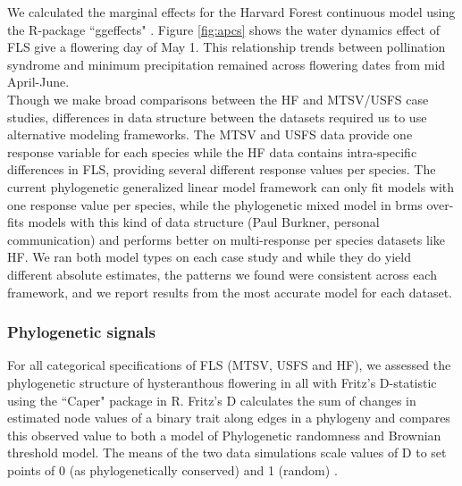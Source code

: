 \documentclass{article}\usepackage[]{graphicx}\usepackage[]{color}
\begin{document}
{%
%
%


\indent We calculated the marginal effects for the Harvard Forest continuous model using the R-package ``ggeffects" \citep{Ludecke2018}. Figure \ref{fig:apcs} shows the water dynamics effect of FLS give a flowering day of May 1. This relationship trends between pollination syndrome and minimum precipitation remained across flowering dates from mid April-June. \\

\noindent Though we make broad comparisons between the HF and MTSV/USFS case studies, differences in data structure between the datasets required us to use alternative modeling frameworks. The MTSV and USFS data provide one response variable for each species while the HF data contains intra-specific differences in FLS, providing several different response values per species. The current phylogenetic generalized linear model framework can only fit models with one response value per species, while the phylogenetic mixed model in brms over-fits models with this kind of data structure (Paul Burkner, personal communication) and performs better on multi-response per species datasets like HF. We ran both model types on each case study and while they do yield different absolute estimates, the patterns we found were consistent across each framework, and we report results from the most accurate model for each dataset.\\

\subsubsection*{Phylogenetic signals}
For all categorical specifications of FLS (MTSV, USFS and HF), we assessed the phylogenetic structure of hysteranthous flowering in all  with Fritz's D-statistic \citep{FRITZ2010} using the ``Caper" package \citep{Orme2013} in R. Fritz's D calculates the sum of changes in estimated node values of a binary trait along edges in a phylogeny and compares this observed value to both a model of Phylogenetic randomness and Brownian threshold model. The means of the two data simulations scale values of D to set points of 0 (as phylogenetically conserved) and 1 (random)  \citep{Orme2013}.\\

}
\end{document}
